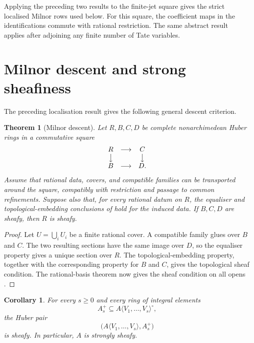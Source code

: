 \documentclass[11pt,reqno]{amsart}
\newtheorem{theorem}{Theorem}[section]
\newtheorem{corollary}[corollary]{Corollary}
\theoremstyle{definition}
\begin{document}
Applying the preceding two results to the finite-jet square gives the strict
localised Milnor rows used below.  For this square, the coefficient maps in
the identifications commute with rational restriction.  The same
abstract result applies after adjoining any finite number of Tate variables.

\section{Milnor descent and strong sheafiness}

The preceding localisation result gives the following general descent
criterion.

\begin{theorem}[Milnor descent]\label{thm:milnor-sheaf-transfer}
Let $R,B,C,D$ be complete nonarchimedean Huber rings in a commutative square
\[
  \begin{matrix}
    R&\longrightarrow&C\\
    \big\downarrow&&\big\downarrow\\
    B&\longrightarrow&D.
  \end{matrix}
\]
Assume that rational data, covers, and compatible families can be transported
around the square, compatibly with restriction and passage to common
refinements.  Suppose also that, for every rational datum on $R$, the equaliser
and topological-embedding conclusions of  hold for
the induced data.  If $B,C,D$ are sheafy, then $R$ is sheafy.
\end{theorem}

\begin{proof}
Let $U=\bigcup_iU_i$ be a finite rational cover.  A compatible family glues over
$B$ and $C$.  The two resulting sections have the same image over $D$, so the
equaliser property gives a unique section over $R$.  The topological-embedding
property, together with the corresponding property for $B$ and $C$, gives the
topological sheaf condition.  The rational-basis theorem now gives the sheaf
condition on all opens \cite[Tag~009O]{Stacks}.
\end{proof}

\begin{corollary}\label{thm:sheafy}
For every $s\geq0$ and every ring of integral elements
\[
  A_s^+\subseteq A\langle V_1,\ldots,V_s\rangle^\circ,
\]
the Huber pair
\[
  \bigl(A\langle V_1,\ldots,V_s\rangle,A_s^+\bigr)
\]
is sheafy.  In particular, $A$ is strongly sheafy.
\end{corollary}
\end{document}
